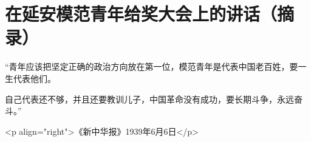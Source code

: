 \section[在延安模范青年给奖大会上的讲话（摘录）]{在延安模范青年给奖大会上的讲话（摘录）}


“青年应该把坚定正确的政治方向放在第一位，模范青年是代表中国老百姓，要一生代表他们。

自己代表还不够，并且还要教训儿子，中国革命没有成功，要长期斗争，永远奋斗。”

<p align="right">《新中华报》1939年6月6日</p>

